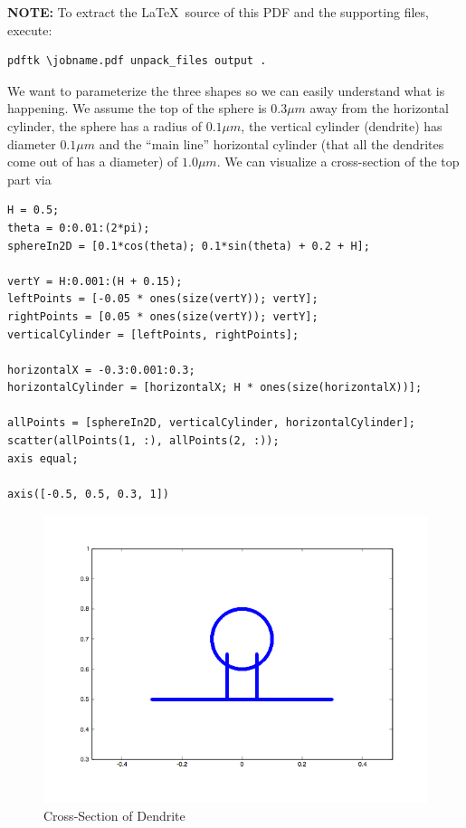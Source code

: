 \documentclass[a4paper,10pt]{article}
\begin{document}
\textbf{NOTE:} To extract the \LaTeX\ source of this PDF and the supporting
files, execute:
\begin{Verbatim}[commandchars=\\\{\}]
pdftk \jobname.pdf unpack_files output .
\end{Verbatim}

We want to parameterize the three shapes so we can easily understand
what is happening. We assume the top of the sphere is \(0.3 \mu m\) away
from the horizontal cylinder, the sphere has a radius of \(0.1 \mu m\), the
vertical cylinder (dendrite) has diameter \(0.1 \mu m\) and the ``main line''
horizontal cylinder (that all the dendrites come out of has a diameter) of
\(1.0 \mu m\). We can visualize a cross-section of the top part via
\begin{verbatim}
H = 0.5;
theta = 0:0.01:(2*pi);
sphereIn2D = [0.1*cos(theta); 0.1*sin(theta) + 0.2 + H];

vertY = H:0.001:(H + 0.15);
leftPoints = [-0.05 * ones(size(vertY)); vertY];
rightPoints = [0.05 * ones(size(vertY)); vertY];
verticalCylinder = [leftPoints, rightPoints];

horizontalX = -0.3:0.001:0.3;
horizontalCylinder = [horizontalX; H * ones(size(horizontalX))];

allPoints = [sphereIn2D, verticalCylinder, horizontalCylinder];
scatter(allPoints(1, :), allPoints(2, :));
axis equal;

axis([-0.5, 0.5, 0.3, 1])
\end{verbatim}

\begin{figure}
  \centering
    \includegraphics[scale=0.3]{cross_section.png}
  \caption{Cross-Section of Dendrite}
  \label{fig:1a}
\end{figure}
\end{document}
